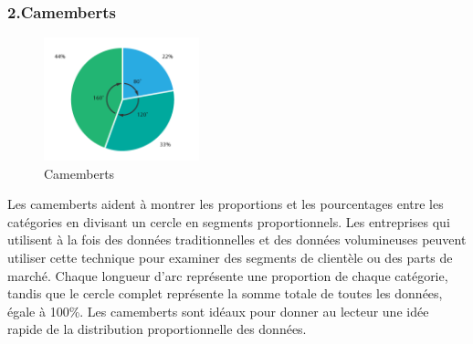 \documentclass[french, a4paper, 12pt]{report}
\begin{document}
\subsubsection{2.Camemberts }
\begin{figure}
\centering
\includegraphics[width=0.4\textwidth]{images/pie_chart.png}
\caption{\label{fig:2.4}Camemberts}
\end{figure}

Les camemberts aident à montrer les proportions et les pourcentages entre les catégories en divisant un cercle en segments proportionnels. Les entreprises qui utilisent à la fois des données traditionnelles et des données volumineuses peuvent utiliser cette technique pour examiner des segments de clientèle ou des parts de marché.
Chaque longueur d'arc représente une proportion de chaque catégorie, tandis que le cercle complet représente la somme totale de toutes les données, égale à 100\%.
Les camemberts sont idéaux pour donner au lecteur une idée rapide de la distribution proportionnelle des données.
\end{document}
